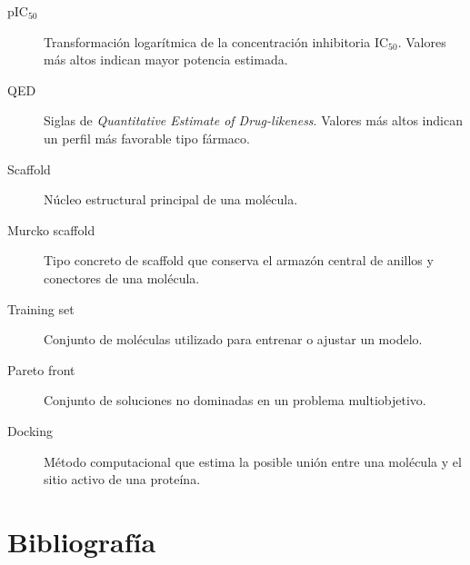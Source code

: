 \documentclass[IB]{TFUOC}%
\begin{document}
\begin{description}
    \item[pIC$_{50}$] Transformación logarítmica de la concentración inhibitoria IC$_{50}$. Valores más altos indican mayor potencia estimada.

    \item[QED] Siglas de \textit{Quantitative Estimate of Drug-likeness}. Valores más altos indican un perfil más favorable tipo fármaco.

    \item[Scaffold] Núcleo estructural principal de una molécula. 

    \item[Murcko scaffold] Tipo concreto de scaffold que conserva el armazón central de anillos y conectores de una molécula. 

    \item[Training set] Conjunto de moléculas utilizado para entrenar o ajustar un modelo. 

    \item[Pareto front] Conjunto de soluciones no dominadas en un problema multiobjetivo. 

    \item[Docking] Método computacional que estima la posible unión entre una molécula y el sitio activo de una proteína. 

\end{description}


\chapter{Bibliografía}
\end{document}
